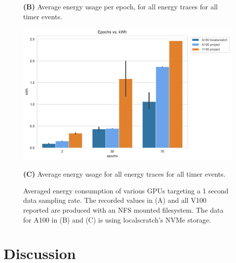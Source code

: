 \documentclass[utf8]{FrontiersinVancouver} %
\newcommand{\TODO}[2]{\todo[inline]{{\bf \color{red} #1} #2}}
\begin{document}
\begin{figure}[htb]
\begin{center}
         {\bf (B)} Average energy usage per epoch, for all energy traces for all timer events.

        \includegraphics[height=0.28\textheight]{images/total_epoch_vs_watts_new}

        {\bf (C)} Average energy usage for all energy traces for all timer events.


  \end{center}

  \caption{Averaged energy consumption of various GPUs targeting a 1 second data sampling rate. The recorded values in (A) and all V100 reported are produced with an NFS mounted filesystem.  The data for A100 in (B) and (C) is using localscratch's NVMe storage.} 
  \label{fig:energy-graphs-compare}
\end{figure}



\section{Discussion}
\label{sec:conclusion}

\end{document}
